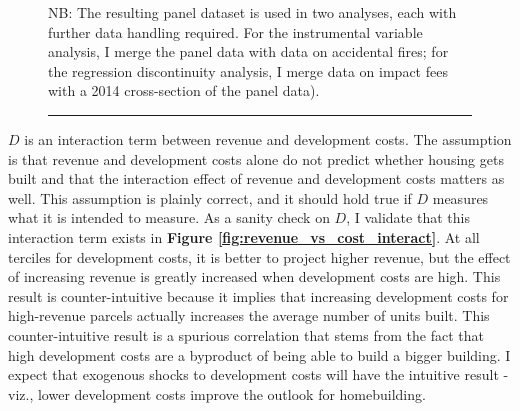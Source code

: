 \documentclass[a4paper,12pt]{article}
\begin{document}
\begin{figure}[bth]
{
}

\medskip
\raggedright
\small{NB: The resulting panel dataset is used in two analyses, each with further data handling required. For the instrumental variable analysis, I merge the panel data with data on accidental fires; for the regression discontinuity analysis, I merge data on impact fees with a 2014 cross-section of the panel data).}
\medskip
\rule{\textwidth}{1pt}
\end{figure}

$D$ is an interaction term between revenue and development costs. The assumption is that revenue and development costs alone do not predict whether housing gets built and that the interaction effect of revenue and development costs matters as well. This assumption is plainly correct, and it should hold true if $D$ measures what it is intended to measure. As a sanity check on $D$, I validate that this interaction term exists in \textbf{Figure \ref{fig:revenue_vs_cost_interact}}. At all terciles for development costs, it is better to project higher revenue, but the effect of increasing revenue is greatly increased when development costs are high. This result is counter-intuitive because it implies that increasing development costs for high-revenue parcels actually increases the average number of units built. This counter-intuitive result is a spurious correlation that stems from the fact that high development costs are a byproduct of being able to build a bigger building. I expect that exogenous shocks to development costs will have the intuitive result - viz., lower development costs improve the outlook for homebuilding.
\end{document}
